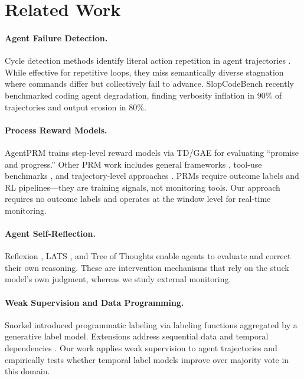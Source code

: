 \documentclass[11pt,a4paper]{article}
\begin{document}
\section{Related Work}
\label{sec:related}

\paragraph{Agent Failure Detection.}
Cycle detection methods identify literal action repetition in agent trajectories \cite{jiang2024cdcs, specra2025, trajad2025}.
While effective for repetitive loops, they miss semantically diverse stagnation where commands differ but collectively fail to advance.
SlopCodeBench \cite{slopcodebench2026} recently benchmarked coding agent degradation, finding verbosity inflation in 90\% of trajectories and output erosion in 80\%.

\paragraph{Process Reward Models.}
AgentPRM \cite{xi2026agentprm} trains step-level reward models via TD/GAE for evaluating ``promise and progress.''
Other PRM work includes general frameworks \cite{prm2025framework}, tool-use benchmarks \cite{toolprmbench2026}, and trajectory-level approaches \cite{trajreward2026}.
PRMs require outcome labels and RL pipelines---they are training signals, not monitoring tools.
Our approach requires no outcome labels and operates at the window level for real-time monitoring.

\paragraph{Agent Self-Reflection.}
Reflexion \cite{shinn2023reflexion}, LATS \cite{zhou2023lats}, and Tree of Thoughts \cite{yao2023tree} enable agents to evaluate and correct their own reasoning.
These are intervention mechanisms that rely on the stuck model's own judgment, whereas we study external monitoring.

\paragraph{Weak Supervision and Data Programming.}
Snorkel \cite{ratner2017snorkel} introduced programmatic labeling via labeling functions aggregated by a generative label model.
Extensions address sequential data \cite{safranchik2020weakly} and temporal dependencies \cite{shin2022universalizing}.
Our work applies weak supervision to agent trajectories and empirically tests whether temporal label models improve over majority vote in this domain.
\end{document}
